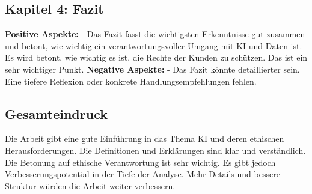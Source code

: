 \documentclass{article}
\begin{document}
\subsection{Kapitel 4: Fazit}
\textbf{Positive Aspekte:}
\newline
- Das Fazit fasst die wichtigsten Erkenntnisse gut zusammen und betont, wie wichtig ein verantwortungsvoller Umgang mit KI und Daten ist.
\newline
- Es wird betont, wie wichtig es ist, die Rechte der Kunden zu schützen. Das ist ein sehr wichtiger Punkt.
\newline
\newline
\textbf{Negative Aspekte:}
\newline
- Das Fazit könnte detaillierter sein. Eine tiefere Reflexion oder konkrete Handlungsempfehlungen fehlen.
\subsection{Gesamteindruck}
Die Arbeit gibt eine gute Einführung in das Thema KI und deren ethischen Herausforderungen. Die Definitionen und Erklärungen sind klar und verständlich. Die Betonung auf ethische Verantwortung ist sehr wichtig. Es gibt jedoch Verbesserungspotential in der Tiefe der Analyse. Mehr Details und bessere Struktur würden die Arbeit weiter verbessern.


\printbibliography
\end{document}
